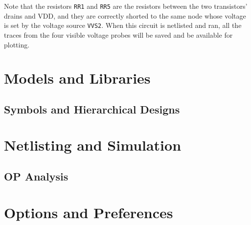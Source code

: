 

Note that the resistors \texttt{RR1} and \texttt{RR5} are the resistors between the two transistors' drains and \textsf{VDD}, and they are correctly shorted to the same node whose voltage is set by the voltage source \texttt{VVS2}.  When this circuit is netlisted and ran, all the traces from the four visible voltage probes will be saved and be available for plotting.

\section{Models and Libraries}
\label{sec_se_symbolsandlibraries}

\subsection{Symbols and Hierarchical Designs}
\label{sec_se_hierarchicaldesigns}

\section{Netlisting and Simulation}
\label{sec_se_netlistingandsimulation}

\subsection{OP Analysis}
\label{sec_se_opanalysis}

\section{Options and Preferences}
\label{sec_se_optionsandpreferences}

